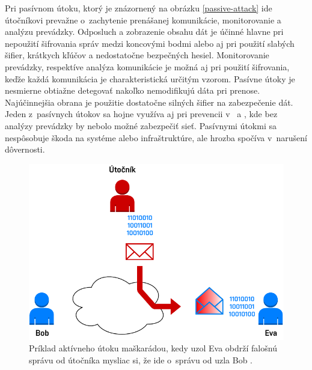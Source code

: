 Pri pasívnom útoku, ktorý je znázornený na obrázku \ref{passive-attack} ide útočníkovi prevažne o~zachytenie prenášanej komunikácie, monitorovanie a  analýzu prevádzky. Odposluch a zobrazenie obsahu dát je účinné hlavne pri nepoužití šifrovania správ medzi koncovými bodmi alebo aj pri použití slabých šifier, krátkych kľúčov a nedostatočne bezpečných hesiel. Monitorovanie prevádzky, respektíve analýza komunikácie je možná aj pri použití šifrovania, keďže každá komunikácia je charakteristická určitým vzorom. Pasívne útoky je nesmierne obtiažne detegovať nakoľko nemodifikujú dáta pri prenose. Najúčinnejšia obrana je použitie dostatočne silných šifier na zabezpečenie dát. Jeden z~pasívnych útokov sa hojne využíva aj pri prevencii v~ a , kde bez analýzy prevádzky by nebolo možné zabezpečiť sieť. Pasívnymi útokmi sa nespôsobuje škoda na systéme alebo infraštruktúre, ale hrozba spočíva v~narušení dôvernosti.

\begin{figure}[H]
	\begin{center}
		\includegraphics[scale=0.55]{obrazky/active-attack-masq.pdf}
	\end{center}
	\caption[Aktívny útok maškaráda]{Príklad aktívneho útoku maškarádou, kedy uzol Eva obdrží falošnú správu od útočníka mysliac si, že ide o~správu od uzla Bob \cite{Stallings2011}.}
	\label{active-attack-masq}
\end{figure}


